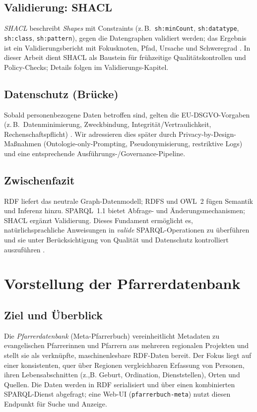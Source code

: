 \subsection{Validierung: SHACL}

\emph{SHACL} beschreibt \emph{Shapes} mit Constraints (z.\,B.\ \texttt{sh:minCount}, \texttt{sh:datatype}, \texttt{sh:class}, \texttt{sh:pattern}), gegen die Datengraphen validiert werden; das Ergebnis ist ein Validierungsbericht mit Fokusknoten, Pfad, Ursache und Schweregrad \cite{SHACL12}. In dieser Arbeit dient SHACL als Baustein für frühzeitige Qualitätskontrollen und Policy-Checks; Details folgen im Validierungs-Kapitel.


\subsection{Datenschutz (Brücke)}

Sobald personenbezogene Daten betroffen sind, gelten die EU-DSGVO-Vorgaben (z.\,B.\ Datenminimierung, Zweckbindung, Integrität/Vertraulichkeit, Rechenschaftspflicht) \cite{euGDPR2016}. Wir adressieren dies später durch Privacy-by-Design-Maßnahmen (Ontologie-only-Prompting, Pseudonymisierung, restriktive Logs) und eine entsprechende Ausführungs-/Governance-Pipeline.

\subsection*{Zwischenfazit}

RDF liefert das neutrale Graph-Datenmodell; RDFS und OWL~2 fügen Semantik und Inferenz hinzu. SPARQL~1.1 bietet Abfrage- und Änderungsmechanismen; SHACL ergänzt Validierung. Dieses Fundament ermöglicht es, natürlichsprachliche Anweisungen in \emph{valide} SPARQL-Operationen zu überführen und sie unter Berücksichtigung von Qualität und Datenschutz kontrolliert auszuführen \cite{Hitzler,RDF11Primer,RDFS11,OWL2Overview,SPARQL11Overview,hogan2021,perezGutierrezSparql,SHACL12}.







\section{Vorstellung der Pfarrerdatenbank}
\label{sec:Pfarrerdatenbank}

\subsection{Ziel und Überblick}
Die \emph{Pfarrerdatenbank} (Meta-Pfarrerbuch) vereinheitlicht Metadaten zu evangelischen Pfarrerinnen und Pfarrern aus mehreren regionalen Projekten und stellt sie als verknüpfte, maschinenlesbare RDF-Daten bereit. Der Fokus liegt auf einer konsistenten, quer über Regionen vergleichbaren Erfassung von Personen, ihren Lebensabschnitten (z.,B. Geburt, Ordination, Dienststellen), Orten und Quellen. Die Daten werden in RDF serialisiert und über einen kombinierten SPARQL-Dienst abgefragt; eine Web-UI (\texttt{pfarrerbuch-meta}) nutzt diesen Endpunkt für Suche und Anzeige.

